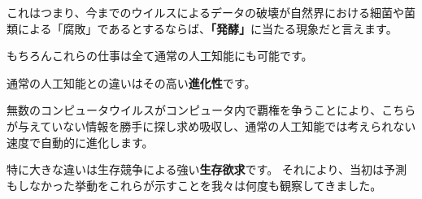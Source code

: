 \documentclass[12pt, unicode]{beamer}
\begin{document}
\begin{frame}

これはつまり、今までのウイルスによるデータの破壊が自然界における細菌や菌類による「腐敗」であるとするならば、\textbf{「発酵」}に当たる現象だと言えます。

\end{frame}

\begin{frame}

もちろんこれらの仕事は全て通常の人工知能にも可能です。

通常の人工知能との違いはその高い\textbf{進化性}です。

無数のコンピュータウイルスがコンピュータ内で覇権を争うことにより、こちらが与えていない情報を勝手に探し求め吸収し、通常の人工知能では考えられない速度で自動的に進化します。

特に大きな違いは生存競争による強い\textbf{生存欲求}です。
それにより、当初は予測もしなかった挙動をこれらが示すことを我々は何度も観察してきました。

\end{frame}
\end{document}

